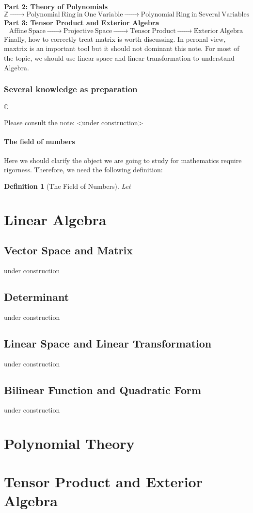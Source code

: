 \documentclass[a4paper,oneside]{book}
\newtheorem{definition}{Definition}[section]
\begin{document}
			\noindent\textbf{Part 2: Theory of Polynomials}
			\begin{equation*}
			\mathbb{Z} \xrightarrow{\quad\quad\quad} \mathrm{Polynomial~Ring~in~One~Variable} \xrightarrow{\quad\quad\quad} \mathrm{Polynomial~Ring~in~Several~Variables}
			\end{equation*}
			\textbf{Part 3: Tensor Product and Exterior Algebra}
			\begin{equation*}
			\mathrm{Affine~Space} \xrightarrow{\quad\quad\quad} \mathrm{Projective~Space} \xrightarrow{\quad\quad\quad} \mathrm{Tensor~Product} \xrightarrow{\quad\quad\quad} \mathrm{Exterior~Algebra}
			\end{equation*}
			Finally, how to correctly treat matrix is worth discussing. In peronal view, maxtrix is an important tool but it should not dominant this note. For most of the topic, we should use linear space and linear transformation to understand Algebra.
			\section{Several knowledge as preparation}
				\subsection{$\mathbb{C}$}
					Please consult the note: <under construction>
				\subsection{The field of numbers}
					Here we should clarify the object we are going to study for mathematics require rigorness. Therefore, we need the following definition:
					\begin{definition}[The Field of Numbers]
						Let
					\end{definition}
\part{Linear Algebra}
	\chapter{Vector Space and Matrix}
	under construction
	\chapter{Determinant}
	under construction
	\chapter{Linear Space and Linear Transformation}
	under construction
	\chapter{Bilinear Function and Quadratic Form}
	under construction
\part{Polynomial Theory}

\part{Tensor Product and Exterior Algebra}
\end{document}
